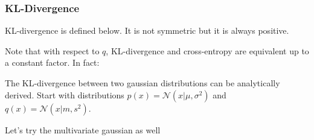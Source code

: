 \documentclass[12pt]{article}
\begin{document}
\subsubsection{KL-Divergence}

KL-divergence is defined below. It is not symmetric but it is always positive. 


Note that with respect to $q$, KL-divergence and cross-entropy are equivalent up to a constant factor. In fact:


The KL-divergence between two gaussian distributions can be analytically derived.
Start with distributions $p(x) = \mathcal{N}(x|\mu, \sigma^2)$ and $q(x) = \mathcal{N}(x|m, s^2)$.


Let's try the multivariate gaussian as well
\end{document}

